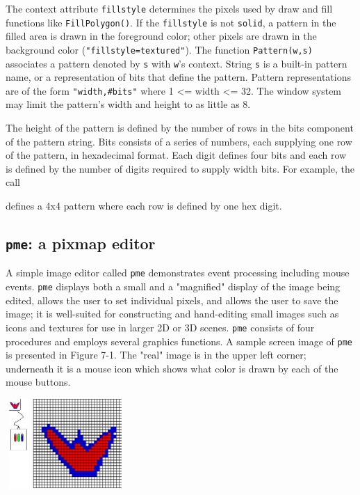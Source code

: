 The context attribute \texttt{fillstyle} determines the pixels used by
draw and fill functions like \texttt{FillPolygon()}.  If the
\texttt{fillstyle} is not \texttt{solid}, a pattern in the filled area
is drawn in the foreground color; other pixels are drawn in the
background color (\texttt{"fillstyle=textured"}).  The function
\texttt{Pattern(w,s)} associates a pattern denoted by \texttt{s} with
\texttt{w}'s context. String \texttt{s} is a built-in pattern name, or
a representation of bits that define the pattern. Pattern
representations are of the form \texttt{"width,\#bits"} where 1
{\textless}= width {\textless}= 32. The window system may limit the
pattern's width and height to as little as 8.

The height of the pattern is defined by the number of rows in the bits
component of the pattern string. Bits consists of a series of numbers,
each supplying one row of the pattern, in hexadecimal format.  Each
digit defines four bits and each row is defined by the number of
digits required to supply width bits. For example, the call


\noindent defines a 4x4 pattern where each row is defined by one hex digit.

\subsection*{\texttt{pme}: a pixmap editor}

A simple image editor called \texttt{pme} demonstrates event
processing including mouse events. \texttt{pme} displays both a small
and a "magnified" display of the image being edited, allows the user
to set individual pixels, and allows the user to save the image; it is
well-suited for constructing and hand-editing small images such as
icons and textures for use in larger 2D or 3D scenes.  \texttt{pme}
consists of four procedures and employs several graphics functions. A
sample screen image of \texttt{pme} is presented in Figure 7-1. The
"real" image is in the upper left corner; underneath it is a mouse
icon which shows what color is drawn by each of the mouse buttons.



\begin{center}
\includegraphics[width=1.7917in,height=1.3575in]{ub-img/ub-img11.jpg}
\end{center}


